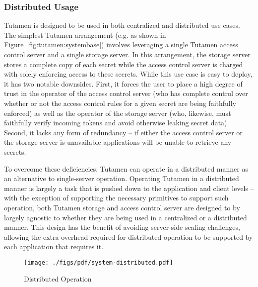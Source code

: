 \subsubsection{Distributed Usage}
\label{sec:tutamen:arch:distributed}

Tutamen is designed to be used in both centralized and distributed use
cases. The simplest Tutamen arrangement (e.g. as shown in
Figure~\ref{fig:tutamen:systembase}) involves leveraging a single
Tutamen access control server and a single storage server. In this
arrangement, the storage server stores a complete copy of each secret
while the access control server is charged with solely enforcing access
to these secrets. While this use case is easy to deploy, it has two
notable downsides. First, it forces the user to place a high degree of
trust in the operator of the access control server (who has complete
control over whether or not the access control rules for a given
secret are being faithfully enforced) as well as the operator of the
storage server (who, likewise, must faithfully verify incoming tokens
and avoid otherwise leaking secret data). Second, it lacks any form of
redundancy -- if either the access control server or the storage server
is unavailable applications will be unable to retrieve any secrets.

To overcome these deficiencies, Tutamen can operate
in a distributed manner as an alternative to
single-server operation. Operating Tutamen in a distributed manner is
largely a task that is pushed down to the application and client
levels -- with the exception of supporting the necessary primitives to
support such operation, both Tutamen storage and access control server
are designed to by largely agnostic to whether they are being used in
a centralized or a distributed manner. This design has the benefit of
avoiding server-side scaling challenges, allowing the extra overhead
required for distributed operation to be supported by each application
that requires it.

\begin{figure}[th]
  \centering
  \texttt{[image: ./figs/pdf/system-distributed.pdf]}
  \caption{Distributed Operation}
  \label{fig:tutamen:systemdistributed}
\end{figure}

